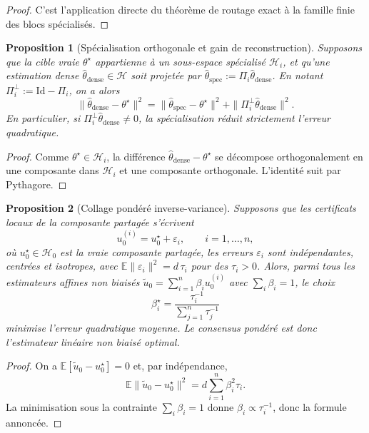 \documentclass[11pt,a4paper]{article}
\newtheorem{proposition}{Proposition}[section]
\newcommand{\Hh}{\mathcal H}
\begin{document}
\begin{proof}
C'est l'application directe du théorème de routage exact à la famille finie des blocs spécialisés.
\end{proof}

\begin{proposition}[Spécialisation orthogonale et gain de reconstruction]
Supposons que la cible vraie \(\theta^\star\) appartienne à un sous-espace spécialisé \(\Hh_i\), et qu'une estimation dense \(\hat\theta_{\mathrm{dense}}\in\Hh\) soit projetée par \(\hat\theta_{\mathrm{spec}}:=\Pi_i\hat\theta_{\mathrm{dense}}\). En notant \(\Pi_i^\perp:=\mathrm{Id}-\Pi_i\), on a alors
\[
\|\hat\theta_{\mathrm{dense}}-\theta^\star\|^2
=
\|\hat\theta_{\mathrm{spec}}-\theta^\star\|^2
+
\|\Pi_i^\perp \hat\theta_{\mathrm{dense}}\|^2.
\]
En particulier, si \(\Pi_i^\perp \hat\theta_{\mathrm{dense}}\neq 0\), la spécialisation réduit strictement l'erreur quadratique.
\end{proposition}

\begin{proof}
Comme \(\theta^\star\in\Hh_i\), la différence \(\hat\theta_{\mathrm{dense}}-\theta^\star\) se décompose orthogonalement en une composante dans \(\Hh_i\) et une composante orthogonale. L'identité suit par Pythagore.
\end{proof}

\begin{proposition}[Collage pondéré inverse-variance]
Supposons que les certificats locaux de la composante partagée s'écrivent
\[
u_0^{(i)} = u_0^\star + \varepsilon_i,\qquad i=1,\dots,n,
\]
où \(u_0^\star\in\Hh_0\) est la vraie composante partagée, les erreurs \(\varepsilon_i\) sont indépendantes, centrées et isotropes, avec \(\mathbb E\|\varepsilon_i\|^2 = d\,\tau_i\) pour des \(\tau_i>0\). Alors, parmi tous les estimateurs affines non biaisés \(\tilde u_0=\sum_{i=1}^n \beta_i u_0^{(i)}\) avec \(\sum_i\beta_i=1\), le choix
\[
\beta_i^\star=\frac{\tau_i^{-1}}{\sum_{j=1}^n \tau_j^{-1}}
\]
minimise l'erreur quadratique moyenne. Le consensus pondéré est donc l'estimateur linéaire non biaisé optimal.
\end{proposition}

\begin{proof}
On a \(\mathbb E[\tilde u_0-u_0^\star]=0\) et, par indépendance,
\[
\mathbb E\|\tilde u_0-u_0^\star\|^2
=
d\sum_{i=1}^n \beta_i^2 \tau_i.
\]
La minimisation sous la contrainte \(\sum_i\beta_i=1\) donne \(\beta_i\propto \tau_i^{-1}\), donc la formule annoncée.
\end{proof}
\end{document}

